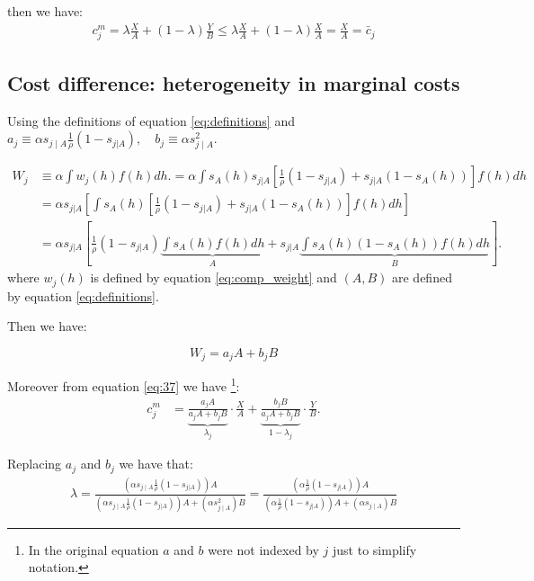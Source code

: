 \documentclass[12pt]{article}
\theoremstyle{plain}
\theoremstyle{plain}
\begin{document}
then we have: 
 \begin{align}
    c^m_j = \lambda \frac{X}{A} + (1-\lambda)\frac{Y}{B} \leq  \lambda \frac{X}{A} + (1-\lambda)\frac{X}{A} = \frac{X}{A} =\bar{c}_j 
\end{align}

\bigskip

\subsection{Cost difference: heterogeneity in marginal costs}\label{sec:appendix3.1}

Using the definitions of equation \ref{eq:definitions} and  $a_j \equiv  \alpha s_{j\mid A} \frac{1}{\rho}(1-s_{j|A}), \quad b_j \equiv \alpha s_{j\mid A}^2 $. 


\begin{align}\label{eq:3.6.1}
W_j & \equiv \alpha \int w_j(h) f(h) dh. = \alpha \int s_A(h) s_{j|A} \left[ \frac{1}{\rho}(1-s_{j|A}) + s_{j|A}(1-s_A(h)) \right] f(h) dh \\
 &= \alpha s_{j|A}\left[ \int s_A(h)   \left[ \frac{1}{\rho}(1-s_{j|A}) + s_{j|A}(1-s_A(h)) \right] f(h) dh \right] \\
&= \alpha s_{j|A} \left[ \frac{1}{\rho}(1-s_{j|A}) \underbrace{\int s_A(h) f(h) dh}_{A} + s_{j|A} \underbrace{\int s_A(h)(1-s_A(h)) f(h) dh}_{B} \right].
\end{align}
where $w_j(h)$ is defined by equation \ref{eq:comp_weight} and $(A,B)$ are defined by equation \ref{eq:definitions}. 

Then we have: 

\begin{equation}
W_j = a_j A + b_j B
\end{equation}

Moreover from equation \ref{eq:37} we have \footnote{In the original equation $a$ and $b$ were not indexed by $j$ just to simplify notation.}:
 \begin{align}
    c^m_j 
    &=  \underbrace{\frac{a_jA}{a_jA+b_jB}}_{\lambda_j}\cdot\frac{X}{A} + \underbrace{\frac{b_jB}{a_jA+b_jB}}_{1-\lambda_j}\cdot\frac{Y}{B}.
\end{align}

Replacing $a_j$ and $b_j$ we have that: 
\begin{align}
    \lambda = \frac{\left(\alpha s_{j\mid A} \frac{1}{\rho}(1-s_{j|A})\right)A}{\left(\alpha s_{j\mid A} \frac{1}{\rho}(1-s_{j|A})\right)A+\left(\alpha s_{j\mid A}^2\right)B}  = \frac{\left(\alpha  \frac{1}{\rho}(1-s_{j|A})\right)A}{\left(\alpha  \frac{1}{\rho}(1-s_{j|A})\right)A+\left(\alpha s_{j\mid A}\right)B} 
\end{align}
\end{document}
